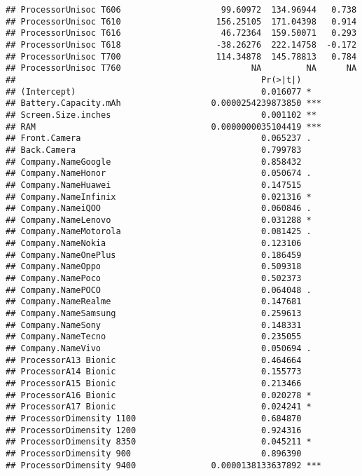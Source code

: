 \documentclass[
]{article}
\begin{document}
\begin{verbatim}
## ProcessorUnisoc T606                    99.60972  134.96944   0.738
## ProcessorUnisoc T610                   156.25105  171.04398   0.914
## ProcessorUnisoc T616                    46.72364  159.50071   0.293
## ProcessorUnisoc T618                   -38.26276  222.14758  -0.172
## ProcessorUnisoc T700                   114.34878  145.78813   0.784
## ProcessorUnisoc T760                          NA         NA      NA
##                                                 Pr(>|t|)    
## (Intercept)                                     0.016077 *  
## Battery.Capacity.mAh                  0.0000254239873850 ***
## Screen.Size.inches                              0.001102 ** 
## RAM                                   0.0000000035104419 ***
## Front.Camera                                    0.065237 .  
## Back.Camera                                     0.799783    
## Company.NameGoogle                              0.858432    
## Company.NameHonor                               0.050674 .  
## Company.NameHuawei                              0.147515    
## Company.NameInfinix                             0.021316 *  
## Company.NameiQOO                                0.060846 .  
## Company.NameLenovo                              0.031288 *  
## Company.NameMotorola                            0.081425 .  
## Company.NameNokia                               0.123106    
## Company.NameOnePlus                             0.186459    
## Company.NameOppo                                0.509318    
## Company.NamePoco                                0.502373    
## Company.NamePOCO                                0.064048 .  
## Company.NameRealme                              0.147681    
## Company.NameSamsung                             0.259613    
## Company.NameSony                                0.148331    
## Company.NameTecno                               0.235055    
## Company.NameVivo                                0.050694 .  
## ProcessorA13 Bionic                             0.464664    
## ProcessorA14 Bionic                             0.155773    
## ProcessorA15 Bionic                             0.213466    
## ProcessorA16 Bionic                             0.020278 *  
## ProcessorA17 Bionic                             0.024241 *  
## ProcessorDimensity 1100                         0.684870    
## ProcessorDimensity 1200                         0.924316    
## ProcessorDimensity 8350                         0.045211 *  
## ProcessorDimensity 900                          0.896390    
## ProcessorDimensity 9400               0.0000138133637892 ***

\end{verbatim}
\end{document}
